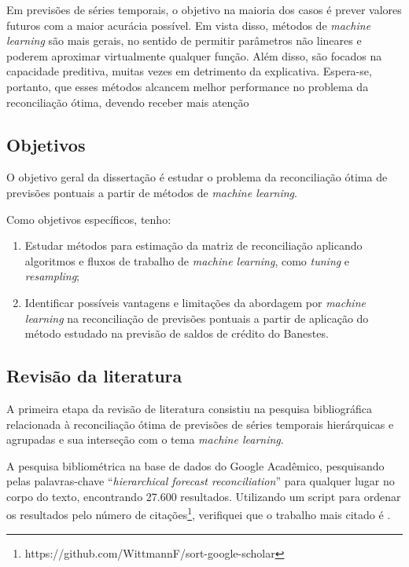 \documentclass[
  12pt,
  oneside,
  a4paper,
  chapter=TITLE,
  section=TITLE,
  brazil]{abntex2}
\providecommand{\tightlist}{%
  \setlength{\itemsep}{0pt}\setlength{\parskip}{0pt}}\usepackage{longtable,booktabs,array}
\begin{document}
Em previsões de séries temporais, o objetivo na maioria dos casos é
prever valores futuros com a maior acurácia possível. Em vista disso,
métodos de \emph{machine learning} são mais gerais, no sentido de
permitir parâmetros não lineares e poderem aproximar virtualmente
qualquer função. Além disso, são focados na capacidade preditiva, muitas
vezes em detrimento da explicativa. Espera-se, portanto, que esses
métodos alcancem melhor performance no problema da reconciliação ótima,
devendo receber mais atenção

\hypertarget{objetivos}{%
\subsection{Objetivos}\label{objetivos}}

O objetivo geral da dissertação é estudar o problema da reconciliação
ótima de previsões pontuais a partir de métodos de \emph{machine
learning}.

Como objetivos específicos, tenho:

\begin{enumerate}
\def\labelenumi{\arabic{enumi}.}
\tightlist
\item
  Estudar métodos para estimação da matriz de reconciliação aplicando
  algoritmos e fluxos de trabalho de \emph{machine learning}, como
  \emph{tuning} e \emph{resampling};
\item
  Identificar possíveis vantagens e limitações da abordagem por
  \emph{machine learning} na reconciliação de previsões pontuais a
  partir de aplicação do método estudado na previsão de saldos de
  crédito do Banestes.
\end{enumerate}

\hypertarget{revisuxe3o-da-literatura}{%
\subsection{Revisão da literatura}\label{revisuxe3o-da-literatura}}

A primeira etapa da revisão de literatura consistiu na pesquisa
bibliográfica relacionada à reconciliação ótima de previsões de séries
temporais hierárquicas e agrupadas e sua interseção com o tema
\emph{machine learning}.

A pesquisa bibliométrica na base de dados do Google Acadêmico,
pesquisando pelas palavras-chave ``\emph{hierarchical forecast
reconciliation}'' para qualquer lugar no corpo do texto, encontrando
27.600 resultados. Utilizando um script para ordenar os resultados pelo
número de citações\footnote{https://github.com/WittmannF/sort-google-scholar},
verifiquei que o trabalho mais citado é
\textcite{hyndman_forecasting_2021}.
\end{document}
